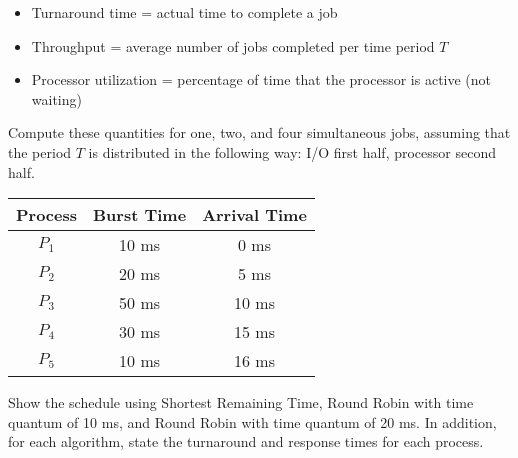 \documentclass[11pt,largemargins]{homework}
\begin{document}
\maketitle

\begin{itemize}[noitemsep,topsep=0pt]
    \item Turnaround time = actual time to complete a job
    \item Throughput = average number of jobs completed per time period $T$
    \item Processor utilization = percentage of time that the processor is
    active (not waiting)
\end{itemize}
Compute these quantities for one, two, and four simultaneous jobs, assuming that
the period $T$ is distributed in the following way: I/O first half, processor
second half.

\clearpage
{}

\begin{center}
\begin{tabular}{|c|c|c|}\hline
    \textbf{Process} & \textbf{Burst Time} & \textbf{Arrival Time} \\\hline
    $P_1$ & 10 ms & 0 ms \\\hline
    $P_2$ & 20 ms & 5 ms \\\hline
    $P_3$ & 50 ms & 10 ms \\\hline
    $P_4$ & 30 ms & 15 ms \\\hline
    $P_5$ & 10 ms & 16 ms \\\hline
\end{tabular}
\end{center}
Show the schedule using Shortest Remaining Time, Round Robin with time quantum
of 10 ms, and Round Robin with time quantum of 20 ms. In addition, for each
algorithm, state the turnaround and response times for each process.

\clearpage
{}
\end{document}
